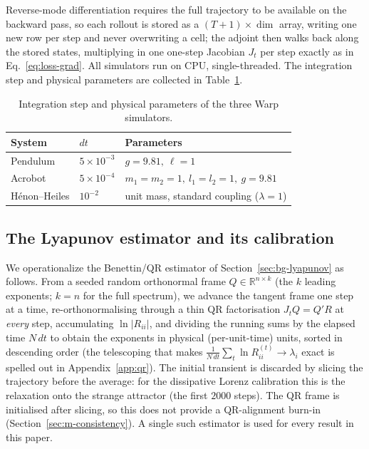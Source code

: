 \documentclass[11pt]{article}
\begin{document}
Reverse-mode differentiation requires the full trajectory to be available on the backward pass, so
each rollout is stored as a $(T{+}1)\times\dim$ array, writing one new row per step and never
overwriting a cell; the adjoint then walks back along the stored states, multiplying in one
one-step Jacobian $J_t$ per step exactly as in Eq.~\eqref{eq:loss-grad}. All simulators run on CPU,
single-threaded. The integration step and physical parameters are collected in
Table~\ref{tab:sim-params}.

\begin{table}[h]
\centering
\begin{tabular}{lll}
\toprule
System & $dt$ & Parameters \\
\midrule
Pendulum & $5\times10^{-3}$ & $g=9.81,\ \ell=1$ \\
Acrobot  & $5\times10^{-4}$ & $m_1=m_2=1,\ l_1=l_2=1,\ g=9.81$ \\
Hénon--Heiles & $10^{-2}$ & unit mass, standard coupling ($\lambda=1$) \\
\bottomrule
\end{tabular}
\caption{Integration step and physical parameters of the three Warp simulators.}
\label{tab:sim-params}
\end{table}

\subsection{The Lyapunov estimator and its calibration}\label{sec:m-lyapunov}

We operationalize the Benettin/QR estimator of Section~\ref{sec:bg-lyapunov} as follows. From a
seeded random orthonormal frame $Q\in\mathbb{R}^{n\times k}$ (the $k$ leading exponents; $k=n$ for
the full spectrum), we advance the tangent frame one step at a time, re-orthonormalising through a
thin QR factorisation $J_t Q = Q'R$ at \emph{every} step, accumulating $\ln\lvert R_{ii}\rvert$, and
dividing the running sums by the elapsed time $N\,dt$ to obtain the exponents in physical
(per-unit-time) units, sorted in descending order (the telescoping that makes
$\frac{1}{N\,dt}\sum_t \ln R^{(t)}_{ii}\to\lambda_i$ exact is spelled out in
Appendix~\ref{app:qr}). The initial transient is discarded by slicing the trajectory before the average: for the dissipative
Lorenz calibration this is the relaxation onto the strange attractor (the first $2000$ steps). The QR frame is initialised after slicing, so this does not provide a QR-alignment burn-in
(Section~\ref{sec:m-consistency}). A
single such estimator is used for every result in this paper.
\end{document}

